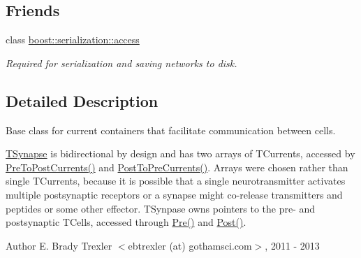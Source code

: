 \subsection*{Friends}
\begin{DoxyCompactItemize}
\item 
\hypertarget{class_t_synapse_ac98d07dd8f7b70e16ccb9a01abf56b9c}{class \hyperlink{class_t_synapse_ac98d07dd8f7b70e16ccb9a01abf56b9c}{boost\+::serialization\+::access}}\label{class_t_synapse_ac98d07dd8f7b70e16ccb9a01abf56b9c}

\begin{DoxyCompactList}\small\item\em Required for serialization and saving networks to disk. \end{DoxyCompactList}\end{DoxyCompactItemize}


\subsection{Detailed Description}
Base class for current containers that facilitate communication between cells. 

\hyperlink{class_t_synapse}{T\+Synapse} is bidirectional by design and has two arrays of T\+Currents, accessed by \hyperlink{class_t_synapse_abf23c375476cac34b7cd90f79179b614}{Pre\+To\+Post\+Currents()} and \hyperlink{class_t_synapse_a91a2599e699b1f911dfe90360bcc3bdb}{Post\+To\+Pre\+Currents()}. Arrays were chosen rather than single T\+Currents, because it is possible that a single neurotransmitter activates multiple postsynaptic receptors or a synapse might co-\/release transmitters and peptides or some other effector. T\+Synpase owns pointers to the pre-\/ and postsynaptic T\+Cells, accessed through \hyperlink{class_t_synapse_afad89e3fd2091900a4e1dc9bc307a694}{Pre()} and \hyperlink{class_t_synapse_a358060ab1845a817039d3611fe886743}{Post()}.

\begin{DoxyAuthor}{Author}
E. Brady Trexler $<$ebtrexler (at) gothamsci.\+com$>$, 2011 -\/ 2013 
\end{DoxyAuthor}


